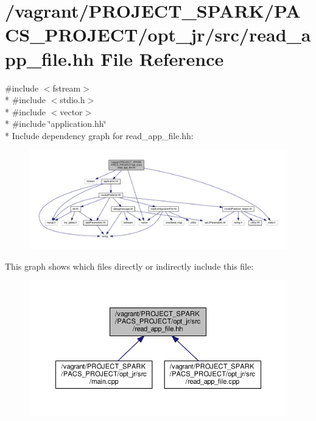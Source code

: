 \hypertarget{read__app__file_8hh}{\section{/vagrant/\-P\-R\-O\-J\-E\-C\-T\-\_\-\-S\-P\-A\-R\-K/\-P\-A\-C\-S\-\_\-\-P\-R\-O\-J\-E\-C\-T/opt\-\_\-jr/src/read\-\_\-app\-\_\-file.hh File Reference}
\label{read__app__file_8hh}
}
{\ttfamily \#include $<$fstream$>$}\\*
{\ttfamily \#include $<$stdio.\-h$>$}\\*
{\ttfamily \#include $<$vector$>$}\\*
{\ttfamily \#include \char`\"{}application.\-hh\char`\"{}}\\*
Include dependency graph for read\-\_\-app\-\_\-file.\-hh\-:\nopagebreak
\begin{figure}[H]
\begin{center}
\leavevmode
\includegraphics[width=350pt]{read__app__file_8hh__incl}
\end{center}
\end{figure}
This graph shows which files directly or indirectly include this file\-:\nopagebreak
\begin{figure}[H]
\begin{center}
\leavevmode
\includegraphics[width=350pt]{read__app__file_8hh__dep__incl}
\end{center}
\end{figure}
